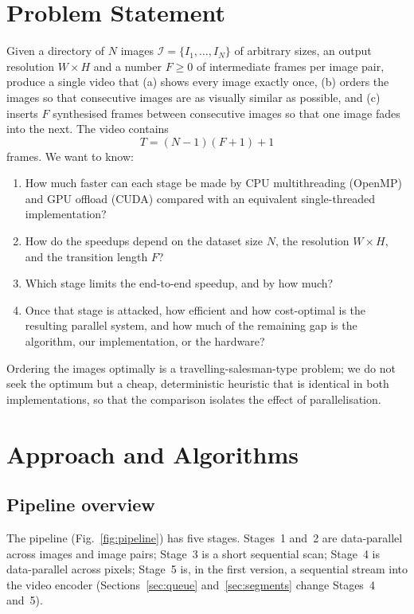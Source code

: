 \documentclass[conference]{IEEEtran}
\begin{document}
\section{Problem Statement}
Given a directory of $N$ images $\mathcal{I}=\{I_1,\dots,I_N\}$ of arbitrary sizes, an output resolution $W\times H$ and a number $F\ge 0$ of intermediate frames per image pair, produce a single video that (a) shows every image exactly once, (b) orders the images so that consecutive images are as visually similar as possible, and (c) inserts $F$ synthesised frames between consecutive images so that one image fades into the next. The video contains
\begin{equation}
  T = (N-1)(F+1) + 1
  \label{eq:frames}
\end{equation}
frames. We want to know:
\begin{enumerate}
  \item How much faster can each stage be made by CPU multithreading (OpenMP) and GPU offload (CUDA) compared with an equivalent single-threaded implementation?
  \item How do the speedups depend on the dataset size $N$, the resolution $W\times H$, and the transition length $F$?
  \item Which stage limits the end-to-end speedup, and by how much?
  \item Once that stage is attacked, how efficient and how cost-optimal is the resulting parallel system, and how much of the remaining gap is the algorithm, our implementation, or the hardware?
\end{enumerate}
Ordering the images optimally is a travelling-salesman-type problem; we do not seek the optimum but a cheap, deterministic heuristic that is identical in both implementations, so that the comparison isolates the effect of parallelisation.

\section{Approach and Algorithms}

\subsection{Pipeline overview}
The pipeline (Fig.~\ref{fig:pipeline}) has five stages. Stages~1 and~2 are data-parallel across images and image pairs; Stage~3 is a short sequential scan; Stage~4 is data-parallel across pixels; Stage~5 is, in the first version, a sequential stream into the video encoder (Sections~\ref{sec:queue} and~\ref{sec:segments} change Stages~4 and~5).
\end{document}
